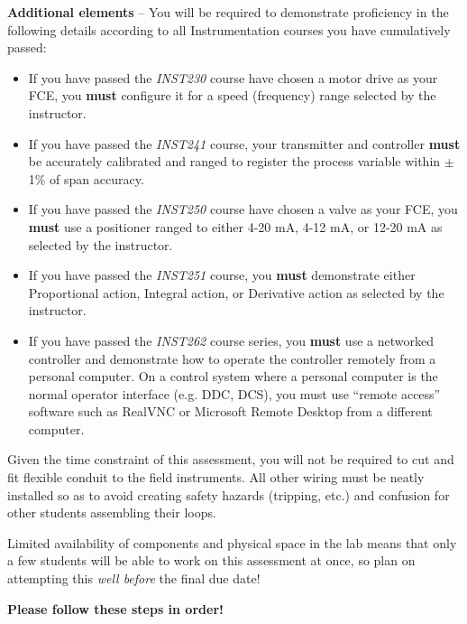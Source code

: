\noindent
{\bf Additional elements} -- You will be required to demonstrate proficiency in the following details according to all Instrumentation courses you have cumulatively passed:

\begin{itemize}
\item{} If you have passed the {\it INST230} course  have chosen a motor drive as your FCE, you {\bf must} configure it for a speed (frequency) range selected by the instructor.
\vskip 5pt
\item{} If you have passed the {\it INST241} course, your transmitter and controller {\bf must} be accurately calibrated and ranged to register the process variable within $\pm$ 1\% of span accuracy.
\vskip 5pt
\item{} If you have passed the {\it INST250} course  have chosen a valve as your FCE, you {\bf must} use a positioner ranged to either 4-20 mA, 4-12 mA, or 12-20 mA as selected by the instructor.
\vskip 5pt
\item{} If you have passed the {\it INST251} course, you {\bf must} demonstrate either Proportional action, Integral action, or Derivative action as selected by the instructor.
\vskip 5pt
\item{} If you have passed the {\it INST262} course series, you {\bf must} use a networked controller and demonstrate how to operate the controller remotely from a personal computer.  On a control system where a personal computer is the normal operator interface (e.g. DDC, DCS), you must use ``remote access'' software such as RealVNC or Microsoft Remote Desktop from a different computer.
\end{itemize}

\vskip 10pt

Given the time constraint of this assessment, you will not be required to cut and fit flexible conduit to the field instruments.  All other wiring must be neatly installed so as to avoid creating safety hazards (tripping, etc.) and confusion for other students assembling their loops.

Limited availability of components and physical space in the lab means that only a few students will be able to work on this assessment at once, so plan on attempting this {\it well before} the final due date!

\vfil \eject

\noindent
{\bf Please follow these steps in order!}

